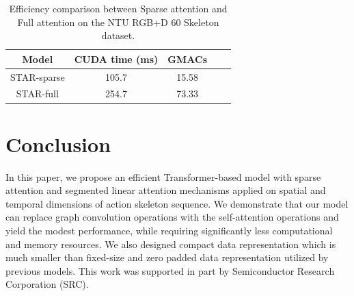 \documentclass[letterpaper]{article} %
\begin{document}
\begin{table}[!h]
\centering
\begin{tabular}{ccccc}
\hline
Model    & CUDA time (ms) & GMACs  \\ \hline
STAR-sparse  & 105.7   & 15.58 \\
STAR-full & 254.7      & 73.33    \\ \hline
\end{tabular}
\caption{Efficiency comparison between Sparse attention and Full attention on the NTU RGB+D 60 Skeleton dataset.}
\label{tab:eff_ablation}
\end{table}


\section{Conclusion}
In this paper, we propose an efficient Transformer-based model with sparse attention and segmented linear attention mechanisms applied on spatial and temporal dimensions of action skeleton sequence. We demonstrate that our model can replace graph convolution operations with the self-attention operations and yield the modest performance, while requiring significantly less computational and memory resources. We also designed compact data representation which is much smaller than fixed-size and zero padded data representation utilized by previous models. This work was supported in part by Semiconductor Research Corporation (SRC).
 

%



\end{document}
